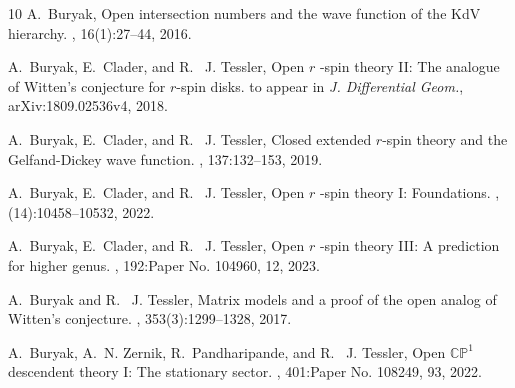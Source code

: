\documentclass[11pt]{amsart}
\theoremstyle{definition}
\theoremstyle{remark}
\newcommand{\<}{\left<}
\renewcommand{\>}{\right>}
\numberwithin{equation}{section}
\begin{document}
\begin{thebibliography}{10}
A.~Buryak,
\newblock Open intersection %
numbers and the wave function of the {K}d{V}
  hierarchy.
, 16(1):27--44, 2016.

A.~Buryak, E.~Clader, and R.~%
J. Tessler,
\newblock Open $r$%
-spin theory {I}{I}: {T}he analogue of {W}itten's conjecture
  for $r$-spin disks.
\newblock to appear in \textit{J. Differential Geom.}, arXiv:1809.02536v4,
  2018.

A.~Buryak, E.~Clader, and R.~%
J. Tessler,
\newblock Closed extended %
{$r$}-spin theory and the {G}elfand-{D}ickey wave
  function.
, 137:132--153, 2019.

A.~Buryak, E.~Clader, and R.~%
J. Tessler,
\newblock Open {$r$%
}-spin theory {I}: {F}oundations.
, (14):10458--10532, 2022.

A.~Buryak, E.~Clader, and R.~%
J. Tessler,
\newblock Open {$r$%
}-spin theory {III}: {A} prediction for higher genus.
, 192:Paper No. 104960, 12, 2023.

A.~Buryak and R.~%
J. Tessler,
\newblock Matrix models %
and a proof of the open analog of {W}itten's
  conjecture.
, 353(3):1299--1328, 2017.

A.~Buryak, A.~N. Zernik, R.~Pandharipande, and R.~%
J. Tessler,
\newblock Open {$\mathbb{CP}^1$%
} descendent theory {I}: {T}he stationary
  sector.
, 401:Paper No. 108249, 93, 2022.


\end{thebibliography}
\end{document}
